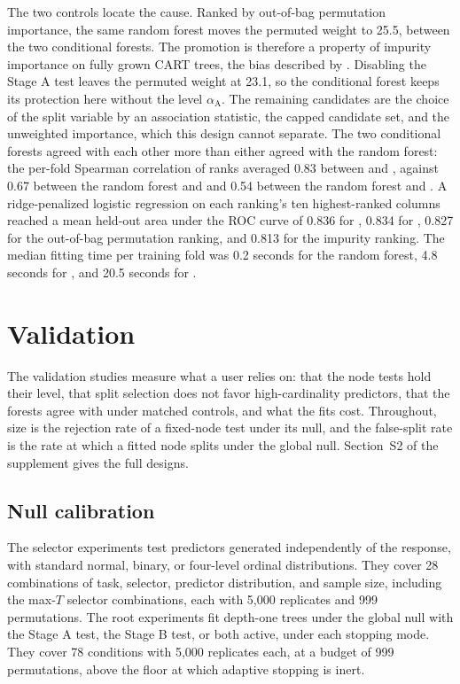 \documentclass[article]{jss}
\newcommand{\citrees}{\pkg{citrees}\xspace}
\begin{document}
The two controls locate the cause. Ranked by out-of-bag permutation
importance, the same random forest moves the permuted weight to 25.5, between
the two conditional forests. The promotion is therefore a property of
impurity importance on fully grown CART trees, the bias described by
\citet{Strobl+Boulesteix+Zeileis+Hothorn:2007}. Disabling the \citrees Stage A
test leaves the permuted weight at 23.1, so the conditional forest keeps its
protection here without the level $\alpha_{\mathrm{A}}$. The remaining
candidates are the choice of the split variable by an association statistic,
the capped candidate set, and the unweighted importance, which this design
cannot separate. The two conditional forests agreed with each other more than
either agreed with the random forest: the per-fold Spearman correlation of
ranks averaged 0.83 between \citrees and , against 0.67 between
the random forest and \citrees and 0.54 between the random forest and
. A ridge-penalized logistic regression on each ranking's ten
highest-ranked columns reached a mean held-out area under the ROC curve of
0.836 for , 0.834 for \citrees, 0.827 for the out-of-bag
permutation ranking, and 0.813 for the impurity ranking. The median fitting
time per training fold was 0.2 seconds for the random forest, 4.8 seconds for
\citrees, and 20.5 seconds for .

\section{Validation} \label{sec:evaluation}

The validation studies measure what a user relies on: that the node tests hold
their level, that split selection does not favor high-cardinality predictors,
that the forests agree with  under matched controls, and what
the fits cost. Throughout, size is the rejection rate of a fixed-node test
under its null, and the false-split rate is the rate at which a fitted node
splits under the global null. Section~S2 of the supplement gives the full
designs.

\subsection{Null calibration} \label{sec:calibration}

The selector experiments test predictors generated independently of the
response, with standard normal, binary, or four-level ordinal distributions.
They cover 28 combinations of task, selector, predictor distribution, and
sample size, including the max-$T$ selector combinations, each with 5,000
replicates and 999 permutations. The root experiments fit depth-one trees
under the global null with the Stage A test, the Stage B test, or both
active, under each stopping mode. They cover 78 conditions with 5,000
replicates each, at a budget of 999 permutations, above the floor at which
adaptive stopping is inert.
\end{document}
